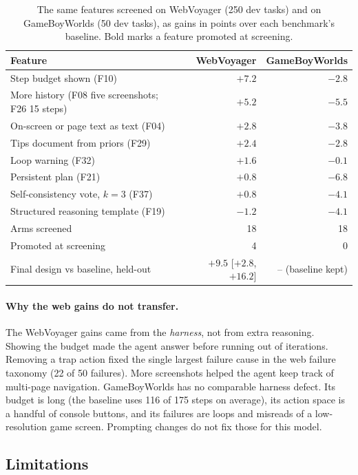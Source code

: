 \begin{table}[t]
\centering
\small
\caption{The same features screened on WebVoyager (250 dev tasks) and on GameBoyWorlds (50 dev tasks), as gains in
points over each benchmark's baseline. Bold marks a feature promoted at screening.}
\label{tab:gb-vs-web}
\begin{tabular}{lrr}
\toprule
Feature & WebVoyager & GameBoyWorlds \\
\midrule
Step budget shown (F10) & $\mathbf{+7.2}$ & $-2.8$ \\
More history (F08 five screenshots; F26 15 steps) & $\mathbf{+5.2}$ & $-5.5$ \\
On-screen or page text as text (F04) & $+2.8$ & $-3.8$ \\
Tips document from priors (F29) & $+2.4$ & $-2.8$ \\
Loop warning (F32) & $+1.6$ & $-0.1$ \\
Persistent plan (F21) & $+0.8$ & $-6.8$ \\
Self-consistency vote, $k{=}3$ (F37) & $+0.8$ & $-4.1$ \\
Structured reasoning template (F19) & $-1.2$ & $-4.1$ \\
\midrule
Arms screened & 18 & 18 \\
Promoted at screening & 4 & 0 \\
Final design vs baseline, held-out & $+9.5$ [$+2.8$, $+16.2$] & -- (baseline kept) \\
\bottomrule
\end{tabular}
\end{table}

\paragraph{Why the web gains do not transfer.} The WebVoyager gains came from the \emph{harness}, not from extra
reasoning. Showing the budget made the agent answer before running out of iterations. Removing a trap action
fixed the single largest failure cause in the web failure taxonomy (22 of 50 failures). More screenshots helped the
agent keep track of multi-page navigation. GameBoyWorlds has no comparable harness defect. Its budget is long (the
baseline uses 116 of 175 steps on average), its action space is a handful of console buttons, and its failures are
loops and misreads of a low-resolution game screen. Prompting changes do not fix those for this model.

\subsection{Limitations}

